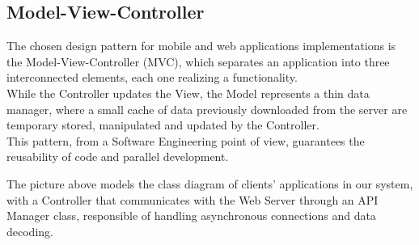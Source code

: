 \documentclass[../../../DD.tex]{subfiles}
\begin{document}
	
	\subsection{Model-View-Controller\label{subsect:2.6.3}}
	The chosen design pattern for mobile and web applications implementations is the Model-View-Controller (MVC), which separates an application into three interconnected elements, each one realizing a functionality. \\

	While the Controller updates the View, the Model represents a thin data manager, where a small cache of data previously downloaded from the server are temporary stored, manipulated and updated by the Controller. \\
	
	This pattern, from a Software Engineering point of view, guarantees the reusability of code and parallel development.
	
	
	The picture above models the class diagram of clients' applications in our system, with a Controller that communicates with the Web Server through an API Manager class, responsible of handling asynchronous connections and data decoding.
	
	\newpage
\end{document}
